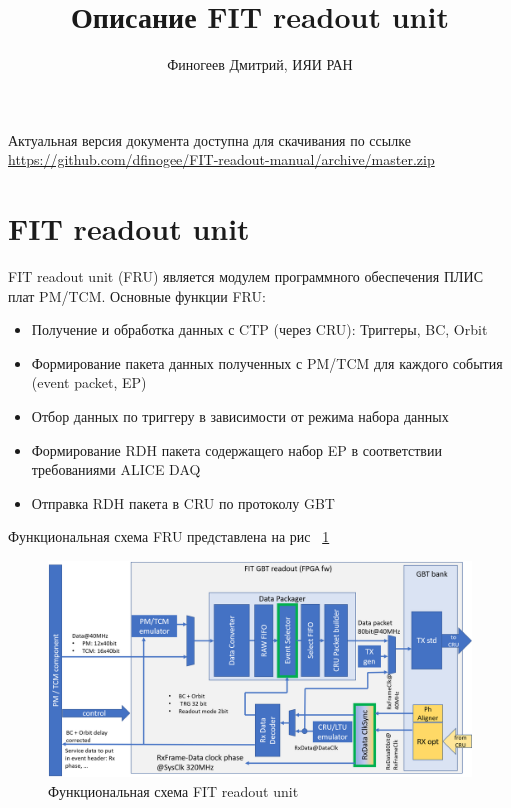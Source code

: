 \documentclass{article}
\title{Описание FIT readout unit}
\author{Финогеев Дмитрий, ИЯИ РАН}
\begin{document}
\maketitle

Актуальная версия документа доступна для скачивания по ссылке
\newline
\url{https://github.com/dfinogee/FIT-readout-manual/archive/master.zip}



\tableofcontents
\newpage

\section{FIT readout unit}
FIT readout unit (FRU) является модулем программного обеспечения ПЛИС плат PM/TCM. Основные функции FRU:

\begin{itemize}
\item Получение и обработка данных с CTP (через CRU): Триггеры, BC, Orbit 
\item Формирование пакета данных полученных с PM/TCM для каждого события (event packet, EP)
\item Отбор данных по триггеру в зависимости от режима набора данных
\item Формирование RDH пакета содержащего набор EP в соответствии требованиями ALICE DAQ 
\item Отправка RDH пакета в CRU по протоколу GBT
\end{itemize}


Функциональная схема FRU представлена на рис ~\ref{fig:2}
\begin{figure}[H]
	\centering 
	\includegraphics[width=1\textwidth]{FIT_readout.png}
	\caption{\label{fig:2} Функциональная схема FIT readout unit}
\end{figure}
\end{document}
